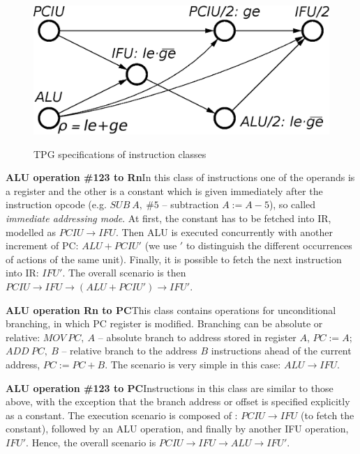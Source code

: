 \begin{figure}
\begin{centering}
{\includegraphics[scale=0.42]{fig/po_CALU_123_PC}}
\par\end{centering}

\caption{TPG specifications of instruction classes\label{app-fig-Scenarios-of-8}}
\vspace{-6mm}
\end{figure}


\textbf{ALU operation \#123 to Rn}\quad{}In this class of instructions
one of the operands is a register and the other is a constant which
is given immediately after the instruction opcode (e.g. $\mathit{SUB\ A,\ \#5}$
-- subtraction $A:=A-5$), so called \emph{immediate addressing mode}.
At first, the constant has to be fetched into IR, modelled as $\mathit{PCIU}\rightarrow\mathit{IFU}$.
Then ALU is executed concurrently with another increment of PC: $\mathit{ALU}+\mathit{PCIU'}$
(we use $'$ to distinguish the different occurrences of actions of
the same unit). Finally, it is possible to fetch the next instruction
into IR: $\mathit{IFU'}$. The overall scenario is then $\mathit{PCIU}\rightarrow\mathit{IFU}\rightarrow(\mathit{ALU}+\mathit{PCIU'})\rightarrow\mathit{IFU'}$.

\textbf{ALU operation Rn to PC}\quad{}This class contains operations
for unconditional branching, in which PC register is modified. Branching
can be absolute or relative: $\mathit{MOV\ PC,\ A}$ -- absolute branch
to address stored in register $A$, $PC:=A$; $\mathit{ADD\ PC,\ B}$
-- relative branch to the address $B$ instructions ahead of the current
address, $PC:=PC+B$. The scenario is very simple in this case: $\mathit{ALU}\rightarrow\mathit{IFU}$.

\textbf{ALU operation \#123 to PC}\quad{}Instructions in this class
are similar to those above, with the exception that the branch address
or offset is specified explicitly as a constant. The execution scenario
is composed of : $\mathit{PCIU}\rightarrow\mathit{IFU}$ (to fetch
the constant), followed by an ALU operation, and finally by another
IFU operation, $\mathit{IFU'}$. Hence, the overall scenario is $\mathit{PCIU}\rightarrow\mathit{IFU}\rightarrow\mathit{ALU}\rightarrow\mathit{IFU'}$.

